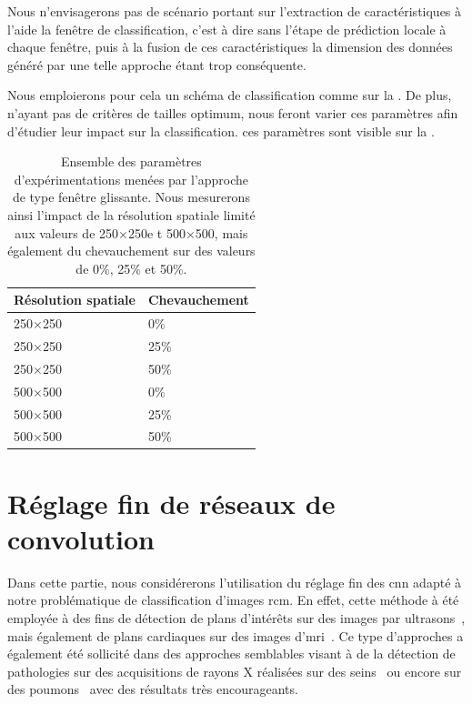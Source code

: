 Nous n'envisagerons pas de scénario portant sur l'extraction de caractéristiques à l'aide la fenêtre de classification, c'est à dire sans l'étape de prédiction locale à chaque fenêtre, puis à la fusion de ces caractéristiques la dimension des données généré par une telle approche étant trop conséquente.\par
 
Nous emploierons pour cela un schéma de classification comme sur la . De plus, n'ayant pas de critères de tailles optimum, nous feront varier ces paramètres afin d'étudier leur impact sur la classification. ces paramètres sont visible sur la .\par

\begin{table}[H]
    \centering
    \begin{tabular*}{0.6\linewidth}{l@{\extracolsep{\fill}}l}
        \toprule
        \textbf{Résolution spatiale}& \textbf{Chevauchement}   \\ \hline
        250$\times$250              & 0\%                      \\ \hline
        250$\times$250              & 25\%                     \\ \hline
        250$\times$250              & 50\%                     \\ \hline 
        500$\times$500              & 0\%                      \\ \hline
        500$\times$500              & 25\%                     \\ \hline
        500$\times$500              & 50\%                     \\
        \bottomrule
    \end{tabular*}
    \caption{Ensemble des paramètres d'expérimentations menées par l'approche de type fenêtre glissante. Nous mesurerons ainsi l'impact de la résolution spatiale limité aux valeurs de 250$\times$250e t 500$\times$500, mais également du chevauchement sur des valeurs de 0\%, 25\% et 50\%.}
    \label{tab:sliding_window_parameters}
\end{table}\par

\section{Réglage fin de réseaux de convolution}
Dans cette partie, nous considérerons l'utilisation du réglage fin des \gls{cnn} adapté à notre problématique de classification d'images \gls{rcm}. En effet, cette méthode à été employée à des fins de détection de plans d'intérêts sur des images par ultrasons~\cite{Chen2015}, mais également de plans cardiaques sur des images d'\gls{mri}~\cite{Margeta2017}. Ce type d'approches a également été sollicité dans des approches semblables visant à de la détection de pathologies sur des acquisitions de rayons X réalisées sur des seins~\cite{Lotter2017} ou encore sur des poumons~\cite{Gao2018} avec des résultats très encourageants.\par

